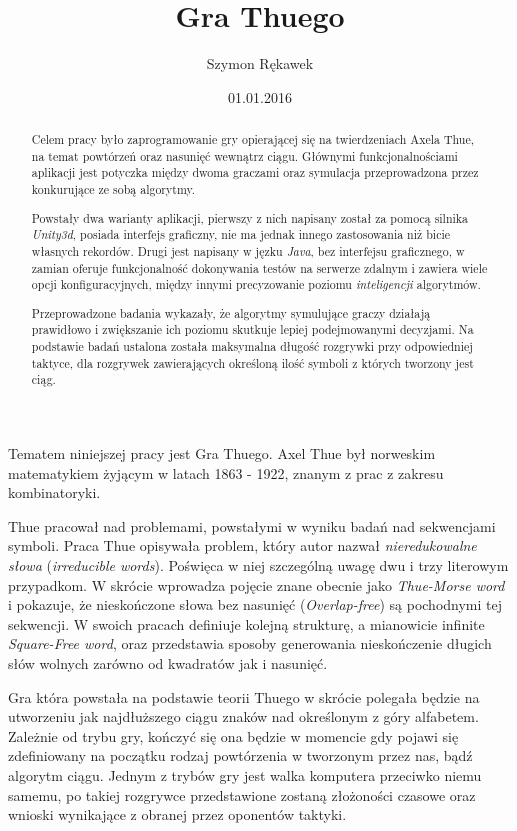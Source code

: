 \documentclass[document]{xmgr}
\author   {Szymon Rękawek}
\title    {Gra Thuego}
\date     {01.01.2016}
\begin{document}
\begin{abstract}
Celem pracy było zaprogramowanie gry opierającej się na twierdzeniach Axela Thue, na temat powtórzeń oraz nasunięć wewnątrz ciągu. Głównymi funkcjonalnościami aplikacji jest potyczka między dwoma graczami oraz symulacja przeprowadzona przez konkurujące ze sobą algorytmy. 

Powstały dwa warianty aplikacji, pierwszy z nich napisany został za pomocą silnika \textit{Unity3d}, posiada interfejs graficzny, nie ma jednak innego zastosowania niż bicie własnych rekordów. Drugi jest napisany w jęzku \textit{Java}, bez interfejsu graficznego, w zamian oferuje funkcjonalność dokonywania testów na serwerze zdalnym i zawiera wiele opcji konfiguracyjnych, między innymi precyzowanie poziomu \textit{inteligencji} algorytmów. 

Przeprowadzone badania wykazały, że algorytmy symulujące graczy działają prawidłowo i zwiększanie ich poziomu skutkuje lepiej podejmowanymi decyzjami. Na podstawie badań ustalona została maksymalna długość rozgrywki przy odpowiedniej taktyce, dla rozgrywek zawierających określoną ilość symboli z których tworzony jest ciąg.
\end{abstract}


\maketitle

\introduction

Tematem niniejszej pracy jest Gra Thuego. Axel Thue był norweskim matematykiem żyjącym w latach 1863 - 1922, znanym z prac z zakresu kombinatoryki.

Thue pracował nad problemami, powstałymi w wyniku badań nad sekwencjami symboli. Praca Thue \cite{repetition} opisywała problem, który autor nazwał \textit{nieredukowalne słowa} (\textit{irreducible words}). Poświęca w niej szczególną uwagę dwu i trzy literowym przypadkom. W skrócie wprowadza pojęcie znane obecnie jako \textit{Thue-Morse word} i pokazuje, że nieskończone słowa bez nasunięć (\textit{Overlap-free}) są pochodnymi tej sekwencji. W swoich pracach definiuje kolejną strukturę, a mianowicie infinite \textit{Square-Free word}, oraz przedstawia sposoby generowania nieskończenie długich słów wolnych zarówno od kwadratów jak i nasunięć.

Gra która powstała na podstawie teorii Thuego w skrócie polegała będzie na utworzeniu jak najdłuższego ciągu znaków nad określonym z góry alfabetem. Zależnie od trybu gry, kończyć się ona będzie w momencie gdy pojawi się zdefiniowany na początku rodzaj powtórzenia w tworzonym przez nas, bądź algorytm ciągu. Jednym z trybów gry jest walka komputera przeciwko niemu samemu, po takiej rozgrywce przedstawione zostaną złożoności czasowe oraz wnioski wynikające z obranej przez oponentów taktyki. 
\end{document}
